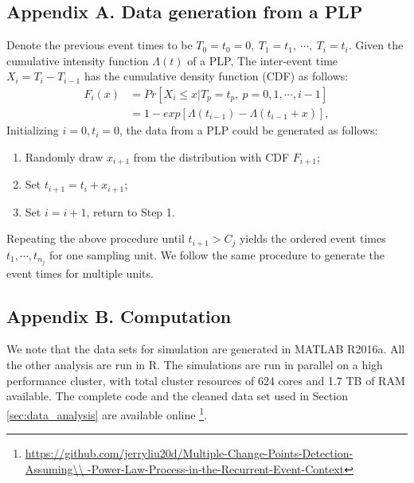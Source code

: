 \documentclass[12pt]{article}
\numberwithin{equation}{section}
\begin{document}
\subsection*{Appendix A. Data generation from a PLP}\label{sec:plp_data}
Denote the previous event times to be $T_0=t_0=0, ~T_1=t_1, ~\cdots, ~T_{i}=t_{i}$. Given the cumulative intensity function $\Lambda(t)$ of a PLP, The inter-event time $X_i = T_i - T_{i-1}$ has the cumulative density function (CDF) as follows: 
\begin{equation}\label{eqn:Ft}
\begin{aligned}
F_{i}(x)&=Pr\left[ X_{i}\leq x|T_p=t_p,~p=0,1, \cdots, i-1\right] \\
&=1-exp\left[ \Lambda(t_{i-1})-\Lambda(t_{i-1}+x)\right],
\end{aligned}
\end{equation}
Initializing $i=0, t_i=0$, the data from a PLP could be generated as follows: 
\begin{enumerate}[Step 1:]
	\item Randomly draw $x_{i+1}$ from the distribution with CDF $F_{i+1}$;
	\item Set $t_{i+1}=t_{i}+x_{i+1}$;
	\item Set $i=i+1$, return to Step 1.
\end{enumerate} 
Repeating the above procedure until $t_{i+1}>C_j$ yields the ordered event times $t_1, \cdots, t_{n_j}$ for one sampling unit. We follow the same procedure to generate the event times for multiple units. 
\subsection*{Appendix B. Computation}\label{sec:code}
We note that the data sets for simulation are generated in MATLAB R2016a. All the other analysis are run in R. The simulations are run in parallel on a high performance cluster, with total cluster resources of 624 cores and 1.7 TB of RAM available. The complete code and the cleaned data set used in Section \ref{sec:data_analysis} are available online \footnote {
	 \url{https://github.com/jerryliu20d/Multiple-Change-Points-Detection-Assuming\\
	 	-Power-Law-Process-in-the-Recurrent-Event-Context}}. 
\end{document}
